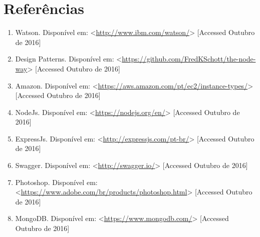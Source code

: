\documentclass[12pt]{report}
\begin{document}
\newpage
\section*{Referências}

\begin{enumerate}
\item \label{watson} Watson. Disponível em: <\url{http://www.ibm.com/watson/}> [Accessed Outubro de 2016]

\item \label{designpat} Design Patterns. Disponível em: <\url{https://github.com/FredKSchott/the-node-way}> [Accessed Outubro de 2016]

\item \label{amazon} Amazon. Disponível em: <\url{https://aws.amazon.com/pt/ec2/instance-types/}> [Accessed Outubro de 2016]

\item \label{nodejs} NodeJs. Disponível em: <\url{https://nodejs.org/en/}> [Accessed Outubro de 2016]

\item \label{express} ExpressJs. Disponível em: <\url{http://expressjs.com/pt-br/}> [Accessed Outubro de 2016]

\item \label{swagger} Swagger. Disponível em: <\url{http://swagger.io/}> [Accessed Outubro de 2016]

\item \label{ps} Photoshop. Disponível em: <\url{https://www.adobe.com/br/products/photoshop.html}> [Accessed Outubro de 2016]

\item \label{mongodb} MongoDB. Disponível em: <\url{https://www.mongodb.com/}> [Accessed Outubro de 2016]

\end{enumerate}
\end{document}
